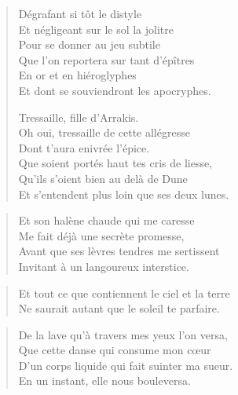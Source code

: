\begin{verse}
  Dégrafant si tôt le distyle\\  %
  	Et négligeant sur le sol la jolitre\\  %
  Pour se donner au jeu subtile\\  %
  Que l’on reportera sur tant d’épîtres\\  %
  En or et en hiéroglyphes\\  %
  Et dont se souviendront les apocryphes.

  Tressaille, fille d’Arrakis.\\  %
  Oh oui, tressaille de cette allégresse\\  %
  Dont t’aura enivrée l’épice.\\  %
  Que soient portés haut tes cris de liesse,\\  %
  Qu’ils s’oient bien au delà de Dune\\  %
  Et s’entendent plus loin que ses deux lunes.
\end{verse}

\begin{verse}%
  \quatrain%
  Et son halène chaude qui me caresse\\  %
  Me fait déjà une secrète promesse,\\  %
  Avant que ses lèvres tendres me sertissent\\  %
  Invitant à un langoureux interstice.
\end{verse}

\begin{verse}%
  \distique%
  Et tout ce que contiennent le ciel et la terre\\  %
  Ne saurait autant que le soleil te parfaire.
\end{verse}

\begin{verse}%
  \quatrain%
  De la lave qu’à travers mes yeux l’on versa,\\  %
  Que cette danse qui consume mon cœur\\  %
  D’un corps liquide qui fait suinter ma sueur.\\  %
  En un instant, elle nous bouleversa.
\end{verse}

